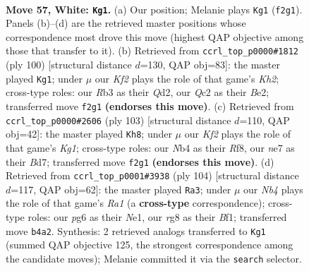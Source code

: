 \documentclass[11pt]{article}
\begin{document}
\clearpage

\begin{figure}[p]\centering
\begin{subfigure}{0.46\textwidth}\centering
\resizebox{\linewidth}{!}{%
\newchessgame
\chessboard[
  setfen={rn1qk1r1/4n1b1/6p1/3p2P1/1N1P1P1p/1R5P/1BQ1BK2/7R w - - 3 57},
  showmover=false,
  pgfstyle=straightmove, color=movearrow, markmove={f2-g1}
]}
\caption{}
\end{subfigure}\hfill
\begin{subfigure}{0.46\textwidth}\centering
\resizebox{\linewidth}{!}{%
\newchessgame
\chessboard[
  setfen={5r1k/3n2r1/1p1p3q/2nP3p/PR2pP2/4N1P1/3QB1RK/8 w - - 1 51},
  showmover=false,
  pgfstyle=straightmove, color=movearrow, markmove={h2-g1}
]}
\caption{}
\end{subfigure}
\\[4pt]
\begin{subfigure}{0.46\textwidth}\centering
\resizebox{\linewidth}{!}{%
\newchessgame
\chessboard[
  setfen={5rk1/3bq1n1/4p2r/3pP3/3N4/1P1B1NQP/1K4R1/8 b - - 8 52},
  showmover=false,
  pgfstyle=straightmove, color=movearrow, markmove={g8-h8}
]}
\caption{}
\end{subfigure}\hfill
\begin{subfigure}{0.46\textwidth}\centering
\resizebox{\linewidth}{!}{%
\newchessgame
\chessboard[
  setfen={b1q1rnk1/5pp1/1p5p/1Pn1p3/2P4P/6P1/1B2QP2/R3NBK1 w - - 5 53},
  showmover=false,
  pgfstyle=straightmove, color=movearrow, markmove={a1-a3}
]}
\caption{}
\end{subfigure}
\caption{\textbf{Move 57, White: \texttt{Kg1}.} (a) Our position; Melanie plays \texttt{Kg1} (\texttt{f2g1}). Panels (b)--(d) are the retrieved master positions whose correspondence most drove this move (highest QAP objective among those that transfer to it). (b) Retrieved from \texttt{ccrl\_top\_p0000\#1812} (ply 100) [structural distance $d$=130, QAP obj=83]: the master played \texttt{Kg1}; under $\mu$ our \emph{Kf2} plays the role of that game's \emph{Kh2}; cross-type roles: our \emph{R}b3 as their \emph{Q}d2, our \emph{Q}c2 as their \emph{B}e2; transferred move \texttt{f2g1} \textbf{(endorses this move)}. (c) Retrieved from \texttt{ccrl\_top\_p0000\#2606} (ply 103) [structural distance $d$=110, QAP obj=42]: the master played \texttt{Kh8}; under $\mu$ our \emph{Kf2} plays the role of that game's \emph{Kg1}; cross-type roles: our \emph{N}b4 as their \emph{R}f8, our \emph{n}e7 as their \emph{B}d7; transferred move \texttt{f2g1} \textbf{(endorses this move)}. (d) Retrieved from \texttt{ccrl\_top\_p0001\#3938} (ply 104) [structural distance $d$=117, QAP obj=62]: the master played \texttt{Ra3}; under $\mu$ our \emph{Nb4} plays the role of that game's \emph{Ra1} (a \textbf{cross-type} correspondence); cross-type roles: our \emph{p}g6 as their \emph{N}e1, our \emph{r}g8 as their \emph{B}f1; transferred move \texttt{b4a2}. Synthesis: 2 retrieved analogs transferred to \texttt{Kg1} (summed QAP objective 125, the strongest correspondence among the candidate moves); Melanie committed it via the \texttt{search} selector.}
\label{fig:thought-m112}
\end{figure}
\end{document}
